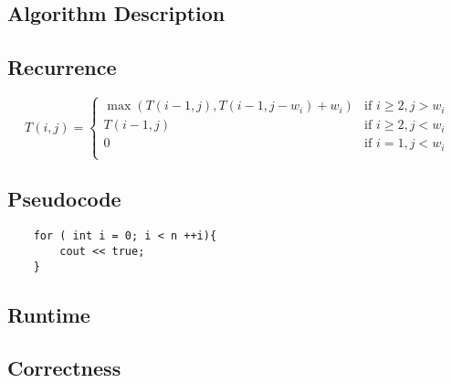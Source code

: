 \documentclass{article}
\begin{document}




\question
\subsection*{Algorithm Description}

\subsection*{Recurrence}
\begin{equation*} T(i,j) = 
        \begin{cases}  
        \max(T(i-1,j), T(i-1,j-w_{i}) + w_i) & \text{if } i \geq 2, j > w_i \\ 
                T(i-1,j)                     & \text{if } i \geq 2, j < w_i \\
                                0            & \text{if } i = 1, j < w_i  \\
        \end{cases} 
\end{equation*}

\subsection*{Pseudocode}
\begin{verbatim}
    for ( int i = 0; i < n ++i){
        cout << true; 
    }
\end{verbatim}

\subsection*{Runtime}

\subsection*{Correctness}



\togglefalse{showQuestion}
\question

\subquestion 
\lipsum 
\subquestion
\lipsum
\subquestion
\subquestion
\subquestion
\question 
\end{document}
